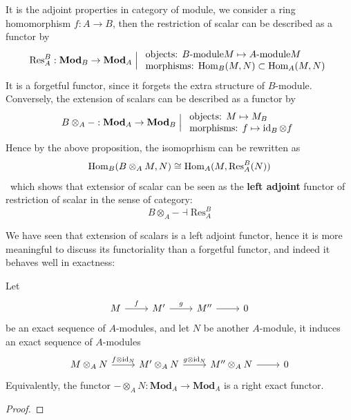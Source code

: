 \begin{remark}
    It is the adjoint properties in category of module, we consider a ring homomorphism \(f:A \to B\), then the restriction of scalar can be described as a functor by
    \[{\mathrm{Res}_A^B: \mathbf{Mod}_B \to \mathbf{Mod}_A} \;\Big|\; \begin{array}{l} \text{objects: }{B\text{-module}M \mapsto A\text{-module}M} \\ \text{morphisms: }{\operatorname{Hom}_B(M,N) \subset \operatorname{Hom}_A(M,N)} \end{array}\]
    It is a forgetful functor, since it forgets the extra structure of \(B\)-module. Conversely, the extension of scalars can be described as a functor by
    \[{B\otimes_A-: \mathbf{Mod}_A \to \mathbf{Mod}_B} \;\Big|\; \begin{array}{l} \text{objects: }{M \mapsto M_B} \\ \text{morphisms: }{f \mapsto \operatorname{id}_B \otimes f} \end{array}\]
    Hence by the above proposition, the isomoprhism can be rewritten as
    \[\operatorname{Hom}_{B}(B \otimes_A M,N) \cong \operatorname{Hom}_{A}(M, \mathrm{Res}_A^B(N))\]\
    which shows that extensior of scalar can be seen as the \textbf{left adjoint} functor of restriction of scalar in the sense of category:
    \[B\otimes_A- \dashv \mathrm{Res}_A^B\]
\end{remark}

We have seen that extension of scalars is a left adjoint functor, hence it is more meaningful to discuss its functoriality than a forgetful functor, and indeed it behaves well in exactness:
\begin{lemma}
    Let
\[\begin{tikzcd}
	M & {M'} & {M''} & 0
	\arrow["f", from=1-1, to=1-2]
	\arrow["g", from=1-2, to=1-3]
	\arrow[from=1-3, to=1-4]
\end{tikzcd}\]
    be an exact sequence of \(A\)-modules, and let \(N\) be another \(A\)-module, it induces an exact sequence of \(A\)-modules
\[\begin{tikzcd}
	{M\otimes_AN} & {M'\otimes_AN} & {M''\otimes_AN} & 0
	\arrow["f\otimes \id_N", from=1-1, to=1-2]
	\arrow["g\otimes \id_N", from=1-2, to=1-3]
	\arrow[from=1-3, to=1-4]
\end{tikzcd}\]
    Equivalently, the functor \( - \otimes_A N: \mathbf{Mod}_A \to \mathbf{Mod}_A\) is a right exact functor.
    
\end{lemma}
\begin{proof}
    
\end{proof}

